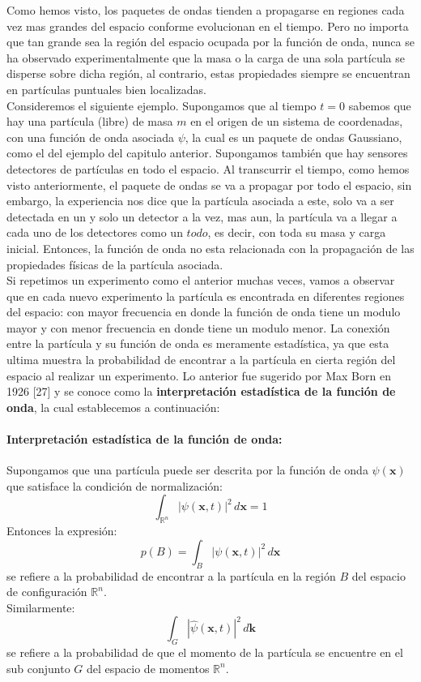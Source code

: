 \documentclass[12pt]{book}
\numberwithin{equation}{chapter}
\def\R{\mathbb{R}}
\def\x{\mathbf{x}}
\def\k{\mathbf{k}}
\begin{document}
Como hemos visto, los paquetes de ondas tienden a propagarse en regiones cada vez mas grandes del espacio conforme evolucionan en el tiempo. Pero no importa que tan grande sea la regi\'on del espacio ocupada por la funci\'on de onda, nunca se ha observado experimentalmente que la masa o la carga de una sola part\'icula se disperse sobre dicha regi\'on, al contrario, estas propiedades siempre se encuentran en part\'iculas puntuales bien localizadas.\\ 
Consideremos el siguiente ejemplo. Supongamos que al tiempo $t=0$ sabemos que hay una part\'icula (libre) de masa $m$ en el origen de un sistema de coordenadas, con una funci\'on de onda asociada $\psi$, la cual es un paquete de ondas Gaussiano, como el del ejemplo del capitulo anterior. Supongamos tambi\'en que hay sensores detectores de part\'iculas en todo el espacio. Al transcurrir el tiempo, como hemos visto anteriormente, el paquete de ondas se va a propagar por todo el espacio, sin embargo, la experiencia nos dice que la part\'icula asociada a este, solo va a ser detectada en un y solo un detector a la vez, mas aun, la part\'icula va a llegar a cada uno de los detectores como un $todo$, es decir, con toda su masa y carga inicial. Entonces, la funci\'on de onda no esta relacionada con la propagaci\'on de las propiedades f\'isicas de la part\'icula asociada.\\
Si repetimos un experimento como el anterior muchas veces, vamos a observar que en cada nuevo experimento la part\'icula es encontrada en diferentes regiones del espacio: con mayor frecuencia en donde la funci\'on de onda tiene un modulo mayor y con menor frecuencia en donde tiene un modulo menor. La conexi\'on entre la part\'icula y su funci\'on de onda es meramente estad\'istica, ya que esta ultima muestra la probabilidad de encontrar a la part\'icula en cierta regi\'on del espacio al realizar un experimento. Lo anterior fue sugerido por Max Born en 1926 [27] y se conoce como la {\bf interpretaci\'on estad\'istica de la funci\'on de onda}, la cual establecemos a continuaci\'on:

\paragraph{Interpretaci\'on estad\'istica de la funci\'on de onda:} 
Supongamos que una part\'icula puede ser descrita por la funci\'on de onda $\psi(\x)$ que satisface la condici\'on de normalizaci\'on:
\begin{equation}\label{norm-c}
\int_{\R^{n}} |\psi(\x,t)|^{2}\, d\x=1
\end{equation}
Entonces la expresi\'on:
\begin{equation}\label{probb}
p(B)= \int_{B} |\psi (\x,t)|^{2}\, d\x 
\end{equation}
se refiere a la probabilidad de encontrar a la part\'icula en la regi\'on $B$ del espacio de configuraci\'on $\R^{n}$.\\ 
Similarmente:
\begin{equation}\label{probm}
\int_{G}  |\hat{\psi}(\x,t)|^{2}\, d\k 
\end{equation}
se refiere a la probabilidad de que el momento de la part\'icula se encuentre en el sub conjunto $G$ del espacio de momentos $\R^{n}$.
\end{document}
